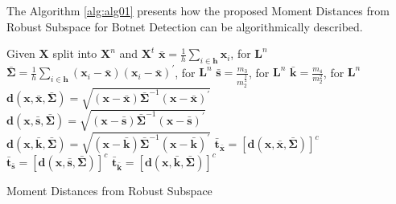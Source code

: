 \documentclass[review]{elsarticle}
\begin{document}
The Algorithm \ref{alg:alg01} presents how the proposed Moment Distances from Robust Subspace for Botnet Detection can be algorithmically described.
\begin{algorithm}
	\label{alg:alg01}
	\SetAlgoLined
	Given $\boldsymbol{X}$ split into $\boldsymbol{X}^n$ and $\boldsymbol{X}^t$\;
	$\bar{\boldsymbol{x}} = \displaystyle\frac{1}{h}\displaystyle\sum_{i\in \boldsymbol{h}} \boldsymbol{x}_i$, for $\boldsymbol{L}^n$\;
	$\boldsymbol{\bar{\Sigma}} = \displaystyle\frac{1}{h}\displaystyle\sum_{i\in \boldsymbol{h}} (\boldsymbol{x}_i - \bar{\boldsymbol{x}})(\boldsymbol{x}_i - \bar{\boldsymbol{x}})^\prime$, for $\boldsymbol{L}^n$\;
	$\boldsymbol{\bar{s}} = \frac{m_3}{m_2^{\frac{3}{2}}}$, for $\boldsymbol{L}^n$\;
	$\boldsymbol{\bar{k}} = \frac{m_4}{m_2^2}$, for $\boldsymbol{L}^n$\;
	$\boldsymbol{d}(\boldsymbol{x},\bar{\boldsymbol{x}}, \boldsymbol{\bar{\Sigma}}) = \sqrt{(\boldsymbol{x} - \bar{\boldsymbol{x}}) \boldsymbol{\bar{\Sigma}}^{-1}(\boldsymbol{x} - \bar{\boldsymbol{x}})^\prime}$\;
	$\boldsymbol{d}(\boldsymbol{x}, \bar{\boldsymbol{s}}, \boldsymbol{\bar{\Sigma}}) = \sqrt{(\boldsymbol{x} - \bar{\boldsymbol{s}}) \boldsymbol{\bar{\Sigma}}^{-1}(\boldsymbol{x} - \bar{\boldsymbol{s}})^\prime}$\;
	$\boldsymbol{d}(\boldsymbol{x}, \bar{\boldsymbol{k}}, \boldsymbol{\bar{\Sigma}}) = \sqrt{(\boldsymbol{x} - \bar{\boldsymbol{k}}) \boldsymbol{\bar{\Sigma}}^{-1}(\boldsymbol{x} - \bar{\boldsymbol{k}})^\prime}$\;
	$\boldsymbol{\bar{t}}_{\bar{\boldsymbol{x}}} = [\boldsymbol{d}(\boldsymbol{x}, \bar{\boldsymbol{x}}, \boldsymbol{\bar{\Sigma}})]^c$\;
	$\boldsymbol{\bar{t}}_{\bar{\boldsymbol{s}}} = [\boldsymbol{d}(\boldsymbol{x}, \bar{\boldsymbol{s}}, \boldsymbol{\bar{\Sigma}})]^c$\;
	$\boldsymbol{\bar{t}}_{\bar{\boldsymbol{k}}} = [\boldsymbol{d}(\boldsymbol{x}, \bar{\boldsymbol{k}}, \boldsymbol{\bar{\Sigma}})]^c$\;
	\caption{Moment Distances from Robust Subspace}
\end{algorithm}
\end{document}
